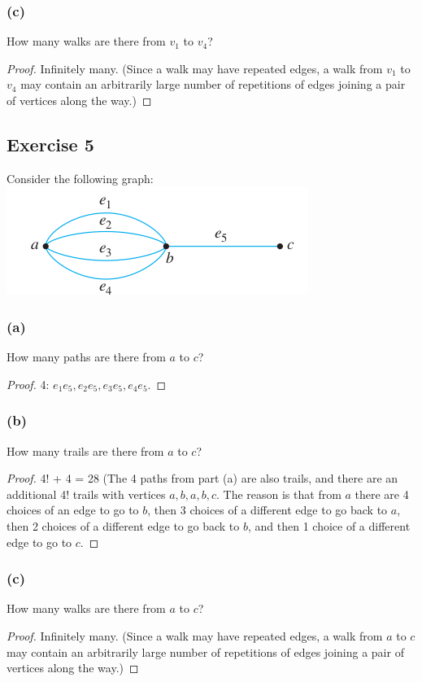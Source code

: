 \documentclass[14pt]{extarticle}
\begin{document}
\subsubsection{(c)}
How many walks are there from \(v_1\) to \(v_4\)?
\begin{proof}
Infinitely many. (Since a walk may have repeated edges, a walk from \(v_1\) to \(v_4\) may contain an arbitrarily large 
number of repetitions of edges joining a pair of vertices along the way.)
\end{proof}

\subsection{Exercise 5}
Consider the following graph:
\includegraphics[scale=0.5]{../images/10.1.5.png}

\subsubsection{(a)}
How many paths are there from \(a\) to \(c\)?
\begin{proof}
4: \(e_1e_5, e_2e_5, e_3e_5, e_4e_5\).
\end{proof}

\subsubsection{(b)}
How many trails are there from \(a\) to \(c\)?
\begin{proof}
4! + 4 = 28 (The 4 paths from part (a) are also trails, and there are an additional 4! trails with vertices \(a,b,a,b,c\). 
The reason is that from \(a\) there are 4 choices of an edge to go to \(b\), then 3 choices of a different edge to go back 
to \(a\), then 2 choices of a different edge to go back to \(b\), and then 1 choice of a different edge to go to \(c\).
\end{proof}

\subsubsection{(c)}
How many walks are there from \(a\) to \(c\)?
\begin{proof}
Infinitely many. (Since a walk may have repeated edges, a walk from \(a\) to \(c\) may contain an arbitrarily large number of 
repetitions of edges joining a pair of vertices along the way.)
\end{proof}
\end{document}
